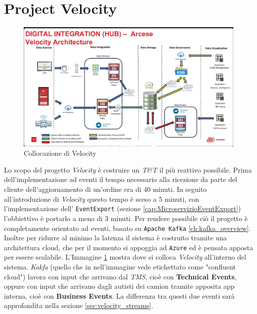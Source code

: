\section{Project Velocity}
\label{sec:project_velocity}
\begin{figure}[htbp]
    \centering
    \includegraphics[width=\textwidth]{images/architecture/collocazione_velocity.png}
    \caption{Collocazione di Velocity}
    \label{fig:collocazione_velocity_img}
\end{figure}
Lo scopo del progetto \textit{Velocity} è costruire un \textit{T\&T} il più reattivo possibile.
Prima dell'implementazione ad eventi il tempo necessario alla ricezione da parte del cliente dell'aggiornamento di un'ordine era di 40 minuti.
In seguito all'introduzione di \textit{Velocity} questo tempo è sceso a 5 minuti, 
con l'implementazione dell' \texttt{EventExport} (sezione \ref{cap:MicroservizioEventExport}) l'obbiettivo è portarlo a meno di 3 minuti.
Per rendere possibile ciò il progetto è completamente orientato ad eventi, basato su \texttt{Apache Kafka} \ref{ch:kafka_overview}. 
Inoltre per ridurre al minimo la latenza il sistema è costruito tramite una architettura cloud, che per il momento si appoggia ad \texttt{Azure} ed è pensata apposta per essere scalabile.
L'Immagine \ref{fig:collocazione_velocity_img} mostra dove si colloca \textit{Velocity} all'interno del sistema.
\textit{Kakfa} (quello che in nell'immagine vede etichettato come "confluent cloud") lavora con input che arrivano dal \textit{TMS}, cioè con \textbf{Technical Events},
oppure con input che arrivano dagli autisti dei camion tramite apposita app interna, cioè con \textbf{Business Events}.
La differenza tra questi due eventi sarà approfondita nella sezione \ref{sec:velocity_streams}.

